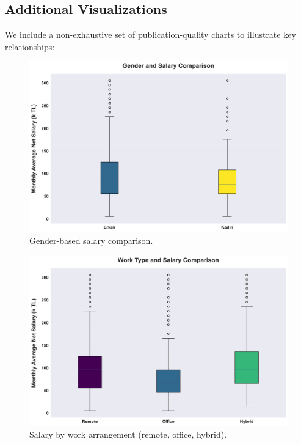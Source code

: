 \subsection{Additional Visualizations}
We include a non-exhaustive set of publication-quality charts to illustrate key relationships:

\begin{figure}[H]
  \centering
  \includegraphics[width=0.85\linewidth]{figures/06_cinsiyet_maas_karsilastirma.png}
  \caption{Gender-based salary comparison.}
  \label{fig:gender-gap}
\end{figure}

\begin{figure}[H]
  \centering
  \includegraphics[width=0.85\linewidth]{figures/07_calisma_sekli_maas_karsilastirma.png}
  \caption{Salary by work arrangement (remote, office, hybrid).}
  \label{fig:work-type}
\end{figure}

